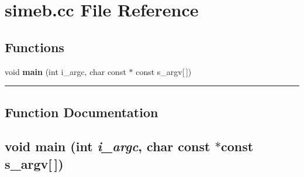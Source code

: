 \section{simeb.cc File Reference}
\label{simeb.cc}


\subsection*{Functions}
\begin{CompactItemize}
\item 
void {\bf main} (int i\_\-argc, char const $\ast$ const s\_\-argv[$\,$])
\end{CompactItemize}
\vspace{0.4cm}\hrule\vspace{0.2cm}
\subsection*{Function Documentation}
\label{simeb.cc_a0}
\subsection{\setlength{\rightskip}{0pt plus 5cm}void main (int {\em i\_\-argc}, char const $\ast$const s\_\-argv[$\,$])}

